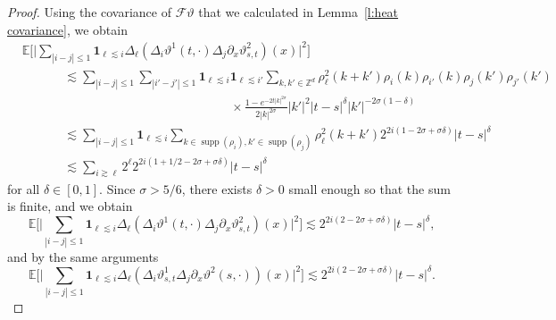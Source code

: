 \documentclass[11pt,a4paper]{article}
\newcommand{\tmop}[1]{\ensuremath{\operatorname{#1}}}
\theoremstyle{remark}
\newcommand{\E}{\mathbb{E}}
\newcommand{\CF}{\ensuremath{\mathscr{F}}}
\begin{document}
\begin{proof}
   Using the covariance of $\CF \vartheta$ that we calculated in Lemma~\ref{l:heat covariance}, we obtain
   \begin{align*}
      &\E\biggl[\biggl|\sum_{|i-j| \leqslant 1} \mathbf{1}_{\ell \lesssim i} \Delta_{\ell} ( \Delta_i \vartheta^1(t,\cdot) \Delta_j \partial_x \vartheta^2_{s,t})(x)\biggr|^2\biggr] \\
      &\hspace{40pt} \lesssim \sum_{| i - j | \leqslant 1} \sum_{| i' - j' | \leqslant 1} \mathbf{1}_{\ell \lesssim i} \mathbf{1}_{\ell \lesssim i'} \sum_{k, k' \in \mathbb{Z}^d} \rho_{\ell}^2 (k+k') \rho_i ( k ) \rho_{i'} ( k ) \rho_j (k') \rho_{j'}(k')\\
      &\hspace{200pt} \times \frac{1 - e^{-2t|k|^{2\sigma}}}{2 |k|^{2 \sigma}} |k'|^2 |t-s|^{\delta} |k'|^{-2\sigma(1 - \delta)}\\
      &\hspace{40pt} \lesssim \sum_{| i - j | \leqslant 1} \mathbf{1}_{\ell \lesssim i} \sum_{k \in \tmop{supp} ( \rho_i ), k' \in \tmop{supp} ( \rho_j )} \rho_{\ell}^2 ( k + k' ) 2^{2i(1 - 2\sigma + \sigma \delta)} |t-s|^{\delta} \\
      &\hspace{40pt} \lesssim \sum_{i \gtrsim \ell} 2^\ell 2^{2i(1 + 1/2 - 2\sigma + \sigma\delta)} |t-s|^{\delta} 
   \end{align*}
   for all $\delta \in [0,1]$. Since $\sigma > 5/6$, there exists $\delta >0$ small enough so that the sum is finite, and we obtain
   \[
      \E\biggl[\biggl|\sum_{|i-j| \leqslant 1} \mathbf{1}_{\ell \lesssim i} \Delta_{\ell} ( \Delta_i \vartheta^1(t,\cdot) \Delta_j \partial_x \vartheta^2_{s,t})(x)\biggr|^2\biggr]  \lesssim 2^{2i(2 - 2\sigma + \sigma \delta)}  |t-s|^{\delta},
   \]
   and by the same arguments
   \[
      \E\biggl[\biggl|\sum_{|i-j| \leqslant 1} \mathbf{1}_{\ell \lesssim i} \Delta_{\ell} ( \Delta_i \vartheta^1_{s,t} \Delta_j \partial_x \vartheta^2(s,\cdot))(x)\biggr|^2\biggr]  \lesssim 2^{2i(2 - 2\sigma + \sigma \delta)}  |t-s|^{\delta}.
   \]   
%   
%   

\end{proof}
\end{document}
